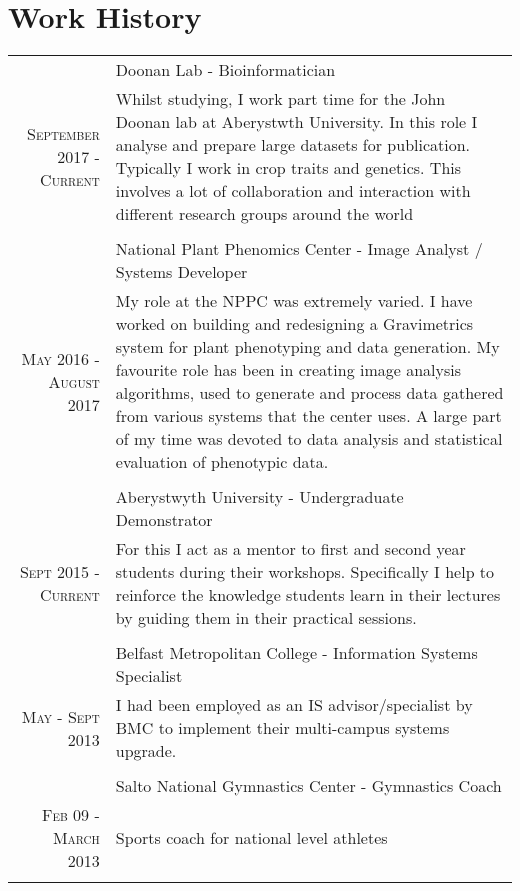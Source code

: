\documentclass[a4paper,9pt]{article}
\begin{document}
\section{Work History}
\begin{longtable}{r|p{11cm}}

  &Doonan Lab - Bioinformatician \\\textsc{September 2017 - Current}
  &\footnotesize{Whilst studying, I work part time for the John Doonan lab at Aberystwth University. In this role I analyse and prepare large datasets for publication. Typically I work in crop traits and genetics. This involves a lot of collaboration and interaction with different research groups around the world}\\\multicolumn{2}{c}{} \\

  &National Plant Phenomics Center - Image Analyst / Systems Developer \\\textsc{May 2016 - August 2017}
  &\footnotesize{
    My role at the NPPC was extremely varied. I have worked on building and redesigning a Gravimetrics system for plant phenotyping and data generation. 
    My favourite role has been in creating image analysis algorithms, used to generate and process data gathered from various systems that the center uses.
    A large part of my time was devoted to data analysis and statistical evaluation of phenotypic data.}\\\multicolumn{2}{c}{} \\
  
  
  &Aberystwyth University - Undergraduate Demonstrator \\ \textsc{Sept 2015 - Current}
  &\footnotesize{For this I act as a mentor to first and second year students during their workshops. Specifically I help to reinforce the knowledge students learn in their lectures by guiding them in their practical sessions.}\\\multicolumn{2}{c}{} \\

  &Belfast Metropolitan College - Information Systems Specialist \\\textsc{May - Sept 2013}
  &\footnotesize{I had been employed as an IS advisor/specialist by BMC to implement their multi-campus systems upgrade.}\\\multicolumn{2}{c}{} \\

  &Salto National Gymnastics Center - Gymnastics Coach \\\textsc{Feb 09 - March 2013}
   & \footnotesize{Sports coach for national level athletes}\\\multicolumn{2}{c}{} \\
\end{longtable}
\end{document}
